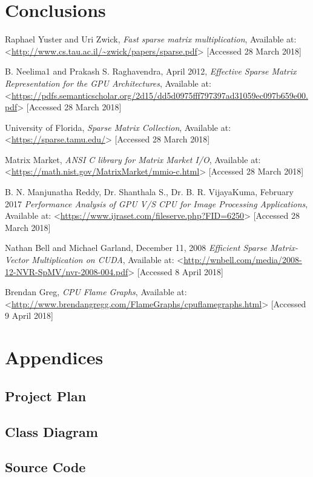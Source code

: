 \documentclass[12pt]{article}
\begin{document}
\pagebreak
\section*{Conclusions}

 

\newpage
\begin{thebibliography}{0}

Raphael Yuster and Uri Zwick, \textit{Fast sparse matrix multiplication}, Available at: <\url{http://www.cs.tau.ac.il/~zwick/papers/sparse.pdf}> [Accessed 28 March 2018]

B. Neelima1 and Prakash S. Raghavendra, April 2012,  \textit{Effective Sparse Matrix Representation for the
GPU Architectures}, Available at: <\url{https://pdfs.semanticscholar.org/2d15/dd5d0975fff797397ad31059ec097b659e00.pdf}> [Accessed 28 March 2018]

University of Florida, \textit{Sparse Matrix Collection}, Available at: <\url{https://sparse.tamu.edu/}> [Accessed 28 March 2018]

Matrix Market, \textit{ANSI C library for Matrix Market I/O}, Available at: <\url{https://math.nist.gov/MatrixMarket/mmio-c.html}> [Accessed 28 March 2018]

B. N. Manjunatha Reddy, Dr. Shanthala S., Dr. B. R. VijayaKuma, February 2017 \textit{Performance Analysis of GPU V/S CPU for Image
Processing Applications}, Available at: <\url{https://www.ijraset.com/fileserve.php?FID=6250}> [Accessed 28 March 2018]


Nathan Bell and Michael Garland, December 11, 2008 \textit{Efficient Sparse Matrix-Vector Multiplication on CUDA}, Available at: <\url{http://wnbell.com/media/2008-12-NVR-SpMV/nvr-2008-004.pdf}> [Accessed 8 April 2018]

Brendan Greg, \textit{CPU Flame Graphs}, Available at: <\url{http://www.brendangregg.com/FlameGraphs/cpuflamegraphs.html}> [Accessed 9 April 2018]

\end{thebibliography}
\newpage

\section*{Appendices}

\newpage

\subsection*{Project Plan}


\subsection*{Class Diagram}


\subsection*{Source Code}
\end{document}
